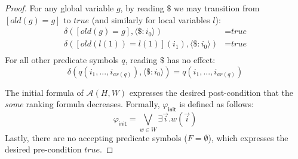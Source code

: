 \documentclass[9pt,nocopyrightspace]{sigplanconf}
\theoremstyle{definition}
\newcommand{\tuple}[1]{\langle #1 \rangle}
\newcommand{\true}{\textit{true}}
\newcommand{\ic}[2]{{\tuple{#1 : #2}}}
\newcommand{\iv}[2]{#1(#2)}
\newcommand{\init}{\textsf{init}}
\renewcommand{\phi}{\varphi}
\newcommand{\ar}{\textit{ar}}
\newcommand{\old}[1]{\textit{old}(#1)}
\begin{document}
\begin{proof}
  For any global variable $g$, by reading $\$$ we may transition from
  $[\old{g} = g]$ to $\true$ (and similarly for local variables $l$):
  \begin{align*}
  \delta([\old{g} = g],\ic{\$}{i_0}) &= \true\\
  \delta([\old{\iv{l}{1}} = \iv{l}{1}](i_1),\ic{\$}{i_0}) &= \true\\
  \end{align*}
  For all other predicate symbols $q$, reading $\$$ has no effect:
  \[ \delta(q(i_1,...,i_{\ar(q)}),\ic{\$}{i_0}) = q(i_1,...,i_{\ar(q)})\]

  The initial formula of $\mathcal{A}(H,W)$ expresses the desired
  post-condition that the \emph{some} ranking formula decreases.  Formally, 
  $\phi_\init$ is defined as
  follows:
  \[ \phi_\init = \bigvee_{w \in W} \exists \vec{i}. w(\vec{i})\]
  Lastly, there are no accepting predicate symbols ($F=\emptyset$), which expresses
  the desired pre-condition $\true$.
\end{proof}
\end{document}
